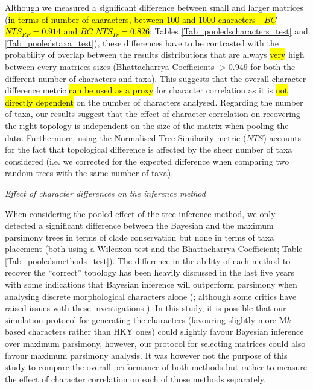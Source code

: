 \documentclass[12pt,letterpaper]{article}
\renewcommand{\subsection}[1]{%
\bigskip
\begin{center}
\begin{large}
\normalfont\itshape #1
\end{large}
\end{center}}
\begin{document}
Although we measured a significant difference between small and larger matrices (\hl{in terms of number of characters, between 100 and 1000 characters - $BC$ $NTS_{RF}=0.914$ and $BC$ $NTS_{Tr}=0.826$}; Tables \ref{Tab_pooledscharacters_test} and \ref{Tab_pooledstaxa_test}),
these differences have to be contrasted with the probability of overlap between the results distributions that are always \hl{very} high between every matrices sizes (Bhattacharrya Coefficients $>0.949$ for both the different number of characters and taxa).
This suggests that the overall character difference metric \hl{can be used as a proxy} for character correlation as it is \hl{not directly dependent} on the number of characters analysed.
Regarding the number of taxa, our results suggest that the effect of character correlation on recovering the right topology is independent on the size of the matrix when pooling the data.
Furthermore, using the Normalised Tree Similarity metric ($NTS$) accounts for the fact that topological difference is affected by the sheer number of taxa considered (i.e. we corrected for the expected difference when comparing two random trees with the same number of taxa).

\subsection{Effect of character differences on the inference method}
When considering the pooled effect of the tree inference method, we only detected a significant difference between the Bayesian and the maximum parsimony trees in terms of clade conservation but none in terms of taxa placement (both using a Wilcoxon test and the Bhattacharrya Coefficient; Table \ref{Tab_pooledsmethods_test}).
The difference in the ability of each method to recover the ``correct'' topology has been heavily discussed in the last five years with some indications that Bayesian inference will outperform parsimony when analysing discrete morphological characters alone (\citealt{wrightbayesian2014,OReilly20160081,puttick2017uncertain}; although some critics have raised issues with these investigations \citealt{spencerefficacy2013,goloboff2017weighted}).
In this study, it is possible that our simulation protocol for generating the characters (favouring slightly more M$k$-based characters rather than HKY ones) could slightly favour Bayesian inference over maximum parsimony, however, our protocol for selecting matrices \citep[i.e. those with in a $CI>0.26$ in a quick preliminary parsimony search;][]{OReilly20160081} could also favour maximum parsimony analysis.
It was however not the purpose of this study to compare the overall performance of both methods but rather to measure the effect of character correlation on each of those methods separately.
\end{document}

